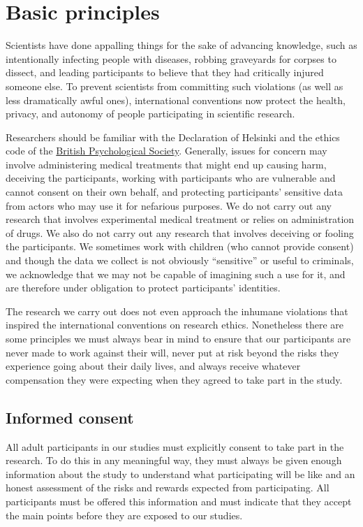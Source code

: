 \documentclass[
  12pt,
]{book}
\begin{document}
\section{Basic principles}\label{basic-principles}

Scientists have done appalling things for the sake of advancing knowledge, such as intentionally infecting people with diseases, robbing graveyards for corpses to dissect, and leading participants to believe that they had critically injured someone else. To prevent scientists from committing such violations (as well as less dramatically awful ones), international conventions now protect the health, privacy, and autonomy of people participating in scientific research.

Researchers should be familiar with the Declaration of Helsinki and the ethics code of the \href{https://www.bps.org.uk/news-and-policy/bps-code-ethics-and-conduct}{British Psychological Society}. Generally, issues for concern may involve administering medical treatments that might end up causing harm, deceiving the participants, working with participants who are vulnerable and cannot consent on their own behalf, and protecting participants' sensitive data from actors who may use it for nefarious purposes. We do not carry out any research that involves experimental medical treatment or relies on administration of drugs. We also do not carry out any research that involves deceiving or fooling the participants. We sometimes work with children (who cannot provide consent) and though the data we collect is not obviously ``sensitive'' or useful to criminals, we acknowledge that we may not be capable of imagining such a use for it, and are therefore under obligation to protect participants' identities.

The research we carry out does not even approach the inhumane violations that inspired the international conventions on research ethics. Nonetheless there are some principles we must always bear in mind to ensure that our participants are never made to work against their will, never put at risk beyond the risks they experience going about their daily lives, and always receive whatever compensation they were expecting when they agreed to take part in the study.

\subsection{Informed consent}\label{informed-consent}

All adult participants in our studies must explicitly consent to take part in the research. To do this in any meaningful way, they must always be given enough information about the study to understand what participating will be like and an honest assessment of the risks and rewards expected from participating. All participants must be offered this information and must indicate that they accept the main points before they are exposed to our studies.
\end{document}
